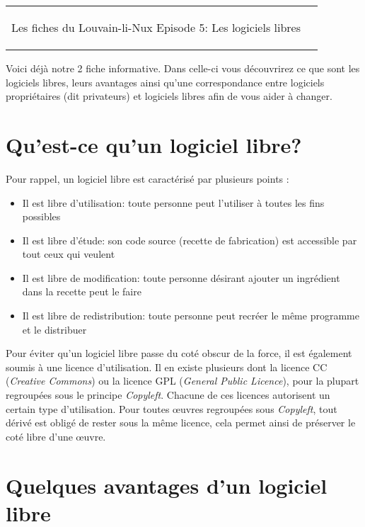 



\begin{tabular}{p{13cm}r}
	\begin{center}{\Large Les fiches du Louvain-li-Nux\linebreak \linebreak
	\LARGE Episode 5: Les logiciels libres}\end{center}
		&
	\usebox{\logollnux}
\end{tabular}

\vspace*{0.5cm}
Voici déjà notre 2 fiche informative. Dans celle-ci vous découvrirez ce que sont les logiciels libres, leurs avantages ainsi qu'une correspondance entre logiciels propriétaires (dit privateurs) et logiciels libres afin de vous aider à changer.

\section*{Qu'est-ce qu'un logiciel libre?}

Pour rappel, un logiciel libre est caractérisé par plusieurs points : 
\begin{itemize}
\item Il est libre d'utilisation: toute personne peut l'utiliser à toutes les fins possibles
\item Il est libre d'étude: son code source (recette de fabrication) est accessible par tout ceux qui veulent
\item Il est libre de modification: toute personne désirant ajouter un ingrédient dans la recette peut le faire
\item Il est libre de redistribution: toute personne peut recréer le même programme et le distribuer
\end{itemize}

Pour éviter qu'un logiciel libre passe du coté obscur de la force, il est également soumis à une licence d'utilisation. Il en existe plusieurs dont la licence CC (\textit{Creative Commons}) ou la licence GPL (\textit{General Public Licence}), pour la plupart regroupées sous le principe \textit{Copyleft}. Chacune de ces licences autorisent un certain type d'utilisation. Pour toutes œuvres regroupées sous \textit{Copyleft}, tout dérivé est obligé de rester sous la même licence, cela permet ainsi de préserver le coté libre d'une œuvre.

\section*{Quelques avantages d'un logiciel libre}

